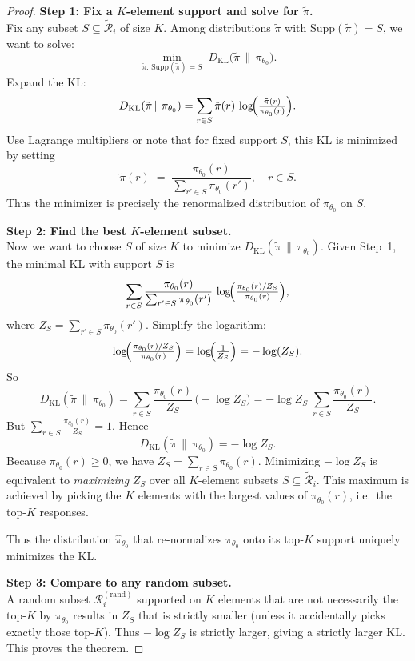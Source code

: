 \begin{proof}
\textbf{Step 1: Fix a $K$-element support and solve for $\tilde{\pi}$.}\\
Fix any subset $S \subseteq \tilde{\mathcal{R}}_i$ of size $K$. Among distributions $\tilde{\pi}$ with $\mathrm{Supp}(\tilde{\pi}) = S$, we want to solve:
\[
\min_{\tilde{\pi}:\,\mathrm{Supp}(\tilde{\pi})=S} \; 
D_{\mathrm{KL}}\bigl(\tilde{\pi}\,\|\,\pi_{\theta_0}\bigr).
\]
Expand the KL:
\[
D_{\mathrm{KL}}(\tilde{\pi}\,\|\,\pi_{\theta_0}) 
= \sum_{r \in S} \tilde{\pi}(r)\,\log\!\Bigl(\tfrac{\tilde{\pi}(r)}{\pi_{\theta_0}(r)}\Bigr).
\]
Use Lagrange multipliers or note that for fixed support $S$, this KL is minimized by setting 
\[
\tilde{\pi}(r) \;=\; \frac{\pi_{\theta_0}(r)}{\sum_{r'\in S}\pi_{\theta_0}(r')}, 
\quad r \in S.
\]
Thus the minimizer is precisely the renormalized distribution of $\pi_{\theta_0}$ on $S$.

\noindent
\textbf{Step 2: Find the best $K$-element subset.}\\
Now we want to choose $S$ of size $K$ to minimize $D_{\mathrm{KL}}(\tilde{\pi}\,\|\,\pi_{\theta_0})$. 
Given Step~1, the minimal KL with support $S$ is
\[
\sum_{r \in S} \frac{\pi_{\theta_0}(r)}{\sum_{r'\in S}\pi_{\theta_0}(r')} 
   \,\log\!\Bigl(\tfrac{\pi_{\theta_0}(r)/Z_S}{\pi_{\theta_0}(r)}\Bigr),
\]
where $Z_S = \sum_{r'\in S} \pi_{\theta_0}(r')$.  Simplify the logarithm:
\[
\log\!\Bigl(\tfrac{\pi_{\theta_0}(r)/Z_S}{\pi_{\theta_0}(r)}\Bigr) 
= \log\!\Bigl(\tfrac{1}{Z_S}\Bigr) 
= -\log(Z_S).
\]
So
\[
D_{\mathrm{KL}}(\tilde{\pi}\,\|\,\pi_{\theta_0}) 
= \sum_{r \in S} \frac{\pi_{\theta_0}(r)}{Z_S}\,\bigl(-\log Z_S \bigr) 
= -\log Z_S \;\sum_{r \in S} \frac{\pi_{\theta_0}(r)}{Z_S}.
\]
But $\sum_{r \in S} \frac{\pi_{\theta_0}(r)}{Z_S} = 1$. Hence
\[
D_{\mathrm{KL}}(\tilde{\pi}\,\|\,\pi_{\theta_0}) = -\log Z_S.
\]
Because $\pi_{\theta_0}(r)\ge 0$, we have $Z_S = \sum_{r\in S} \pi_{\theta_0}(r)$. Minimizing $-\log Z_S$ is equivalent to \emph{maximizing} $Z_S$ over all $K$-element subsets $S \subseteq \tilde{\mathcal{R}}_i$. This maximum is achieved by picking the $K$ elements with the largest values of $\pi_{\theta_0}(r)$, i.e.\ the top-$K$ responses. 

Thus the distribution $\hat{\pi}_{\theta_0}$ that re-normalizes $\pi_{\theta_0}$ onto its top-$K$ support uniquely minimizes the KL.

\noindent
\textbf{Step 3: Compare to any random subset.}\\
A random subset $\mathcal{R}_i^{(\mathrm{rand})}$ supported on $K$ elements that are not necessarily the top-$K$ by $\pi_{\theta_0}$ results in $Z_S$ that is strictly smaller (unless it accidentally picks exactly those top-$K$). Thus $-\log Z_S$ is strictly larger, giving a strictly larger KL. This proves the theorem.
\end{proof}


